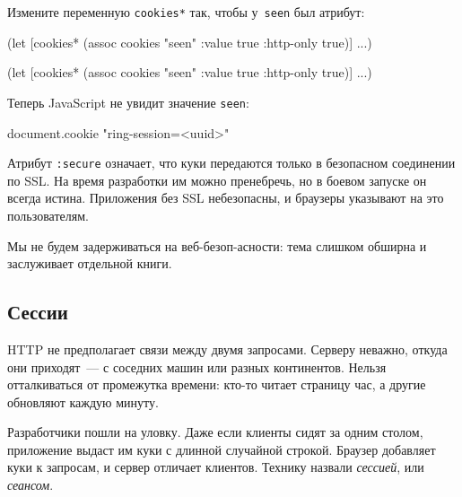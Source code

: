 \noindent
Измените переменную \verb|cookies*| так, чтобы у~\verb|seen| был атрибут:

\ifx\DEVICETYPE\MOBILE

\begin{english}
  \begin{clojure}
(let [cookies*
      (assoc cookies "seen"
        {:value true
         :http-only true})]
  ...)
  \end{clojure}
\end{english}

\else

\begin{english}
  \begin{clojure}
(let [cookies* (assoc cookies "seen"
                      {:value true :http-only true})]
  ...)
  \end{clojure}
\end{english}

\fi

Теперь JavaScript не увидит значение \verb|seen|:

\begin{english}
  \begin{js}
document.cookie
"ring-session=<uuid>"
  \end{js}
\end{english}

Атрибут \verb|:secure| означает, что куки передаются только в безопасном
соединении по SSL. На время разработки им можно пренебречь, но в боевом запуске
он всегда истина. Приложения без SSL небезопасны, и браузеры указывают на это
пользователям.

Мы не будем задерживаться на веб-без\-оп-ас\-нос\-ти: тема слишком обширна и
заслуживает отдельной книги.

\subsection{Сессии}


HTTP не предполагает связи между двумя запросами. Серверу неважно, откуда они
приходят~--- с соседних машин или разных континентов. Нельзя отталкиваться от
промежутка времени: кто-то читает страницу час, а другие обновляют каждую
минуту.

Разработчики пошли на уловку. Даже если клиенты сидят за одним столом,
приложение выдаст им куки с длинной случайной строкой. Браузер добавляет куки к
запросам, и сервер отличает клиентов. Технику назвали \emph{сессией}, или
\emph{сеансом}.

